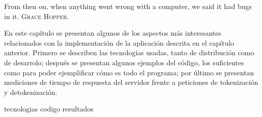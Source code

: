 %
%
%

{
  \epigrafe
  {%
    From then on, when anything went wrong with a computer, we said it had bugs
    in it.%
  }
  {%
     \textsc{Grace Hopper}.%
  }
}

\noindent
En este capítulo se presentan algunos de los aspectos más interesantes
relacionados con la implementación de la aplicación descrita en el capítulo
anterior. Primero se describen las tecnologías usadas, tanto de distribución
como de desarrolo; después se presentan algunos ejemplos del código, los
suficientes como para poder ejemplificar cómo es todo el programa; por último
se presentan mediciones de tiempo de respuesta del servidor frente a peticiones
de tokenización y detokenización.

{tecnologias}
{codigo}
{resultados}
